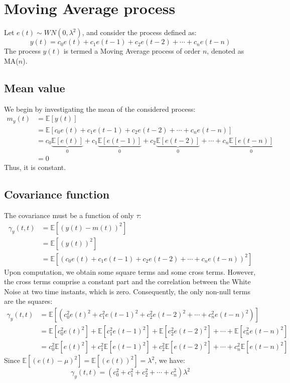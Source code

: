\section{Moving Average process}

Let $e(t)\sim WN(0,\lambda^2)$, and consider the process defined as:
\[y(t)=c_0e(t)+c_1e(t-1)+c_2e(t-2)+\cdots+c_n e(t-n)\]
The process $y(t)$ is termed a Moving Average process of order $n$, denoted as MA($n$).

\subsection{Mean value}
We begin by investigating the mean of the considered process:
\begin{align*}
    m_y(t)  &=\mathbb{E}\left[y(t)\right] \\
            &=\mathbb{E}\left[c_0e(t)+c_1e(t-1)+c_2e(t-2)+\cdots+c_n e(t-n)\right] \\
            &=c_0\underbrace{\mathbb{E}\left[e(t)\right]}_0  + c_1\underbrace{\mathbb{E}\left[e(t-1)\right]}_0  + c_2\underbrace{\mathbb{E}\left[e(t-2)\right]}_0  + \cdots + c_n\underbrace{\mathbb{E}\left[e(t-n)\right]}_0 \\
            &=0
\end{align*}
Thus, it is constant.

\subsection{Covariance function}
The covariance must be a function of only $\tau$: 
\begin{align*}
    \gamma_y(t,t)   &=\mathbb{E}\left[{\left(y(t)-m(t)\right)}^2\right] \\
                    &=\mathbb{E}\left[{\left(y(t)\right)}^2\right] \\
                    &=\mathbb{E}\left[{\left(c_0e(t)+c_1e(t-1)+c_2e(t-2)+\cdots+c_n e(t-n)\right)}^2\right] 
\end{align*}
Upon computation, we obtain some square terms and some cross terms. 
However, the cross terms comprise a constant part and the correlation between the  White Noise at two time instants, which is zero. 
Consequently, the only non-null terms are the squares:
\begin{align*}
    \gamma_y(t,t)   &=\mathbb{E}\left[\left(c_0^2{e(t)}^2+c_1^2{e(t-1)}^2+c_2^2{e(t-2)}^2+\cdots+c_n^2{e(t-n)}^2\right)\right] \\
                    &=\mathbb{E}\left[c_0^2{e(t)}^2\right]+\mathbb{E}\left[c_1^2{e(t-1)}^2\right]+\mathbb{E}\left[c_2^2{e(t-2)}^2\right]+\cdots+\mathbb{E}\left[c_n^2{e(t-n)}^2\right] \\
                    &=c_0^2\mathbb{E}\left[{e(t)}^2\right]+c_1^2\mathbb{E}\left[{e(t-1)}^2\right]+c_2^2\mathbb{E}\left[{e(t-2)}^2\right]+\cdots+c_n^2\mathbb{E}\left[{e(t-n)}^2\right]
\end{align*}
Since $\mathbb{E}\left[{\left(e(t)-\mu\right)}^2\right]=\mathbb{E}\left[{\left(e(t)\right)}^2\right]=\lambda^2$, we have:
\[\gamma_y(t,t)=\left(c_0^2+c_1^2+c_2^2+\cdots+c_n^2\right)\lambda^2\]

